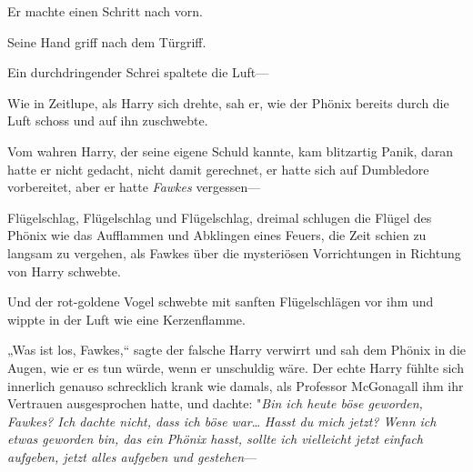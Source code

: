 Er machte einen Schritt nach vorn.

Seine Hand griff nach dem Türgriff.

Ein durchdringender Schrei spaltete die Luft—

Wie in Zeitlupe, als Harry sich drehte, sah er, wie der Phönix bereits durch die Luft schoss und auf ihn zuschwebte.

Vom wahren Harry, der seine eigene Schuld kannte, kam blitzartig Panik, daran hatte er nicht gedacht, nicht damit gerechnet, er hatte sich auf Dumbledore vorbereitet, aber er hatte \emph{Fawkes} vergessen—

Flügelschlag, Flügelschlag und Flügelschlag, dreimal schlugen die Flügel des Phönix wie das Aufflammen und Abklingen eines Feuers, die Zeit schien zu langsam zu vergehen, als Fawkes über die mysteriösen Vorrichtungen in Richtung von Harry schwebte.

Und der rot-goldene Vogel schwebte mit sanften Flügelschlägen vor ihm und wippte in der Luft wie eine Kerzenflamme.

„Was ist los, Fawkes,“ sagte der falsche Harry verwirrt und sah dem Phönix in die Augen, wie er es tun würde, wenn er unschuldig wäre. Der echte Harry fühlte sich innerlich genauso schrecklich krank wie damals, als Professor McGonagall ihm ihr Vertrauen ausgesprochen hatte, und dachte: "\emph{Bin ich heute böse geworden, Fawkes? Ich dachte nicht, dass ich böse} \emph{war}… \emph{Hasst du mich jetzt? Wenn ich etwas geworden bin, das ein Phönix hasst, sollte ich vielleicht jetzt einfach aufgeben, jetzt alles aufgeben und gestehen}—

